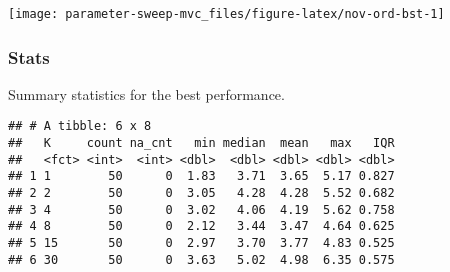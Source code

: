 \documentclass[]{book}
\newenvironment{Shaded}{\begin{snugshade}}{\end{snugshade}}
\newcommand{\DataTypeTok}[1]{\textcolor[rgb]{0.13,0.29,0.53}{#1}}
\newcommand{\KeywordTok}[1]{\textcolor[rgb]{0.13,0.29,0.53}{\textbf{#1}}}
\newcommand{\NormalTok}[1]{#1}
\newcommand{\OperatorTok}[1]{\textcolor[rgb]{0.81,0.36,0.00}{\textbf{#1}}}
\newcommand{\OtherTok}[1]{\textcolor[rgb]{0.56,0.35,0.01}{#1}}
\newcommand{\StringTok}[1]{\textcolor[rgb]{0.31,0.60,0.02}{#1}}
\begin{document}
\texttt{[image: parameter-sweep-mvc\_files/figure-latex/nov-ord-bst-1]}

\hypertarget{stats-52}{%
\subsubsection{Stats}\label{stats-52}}

Summary statistics for the best performance.

\begin{Shaded}
\end{Shaded}

\begin{verbatim}
## # A tibble: 6 x 8
##   K     count na_cnt   min median  mean   max   IQR
##   <fct> <int>  <int> <dbl>  <dbl> <dbl> <dbl> <dbl>
## 1 1        50      0  1.83   3.71  3.65  5.17 0.827
## 2 2        50      0  3.05   4.28  4.28  5.52 0.682
## 3 4        50      0  3.02   4.06  4.19  5.62 0.758
## 4 8        50      0  2.12   3.44  3.47  4.64 0.625
## 5 15       50      0  2.97   3.70  3.77  4.83 0.525
## 6 30       50      0  3.63   5.02  4.98  6.35 0.575
\end{verbatim}
\end{document}
